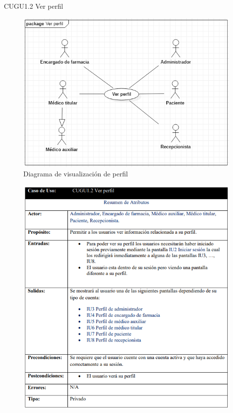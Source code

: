 \documentclass[12pt,letterpaper]{article}
\begin{document}
            \newpage
            CUGU1.2 Ver perfil
            \begin{figure}[H]
                \centering
                \includegraphics [scale=0.4]{casosUso/verPerfil}
                \caption{Diagrama de visualización de perfil}
            \end{figure}
            \begin{figure}[H]
                \centering
                \includegraphics [scale=0.7]{casosUso/especificacionVerPerfil}
            \end{figure}
\end{document}
